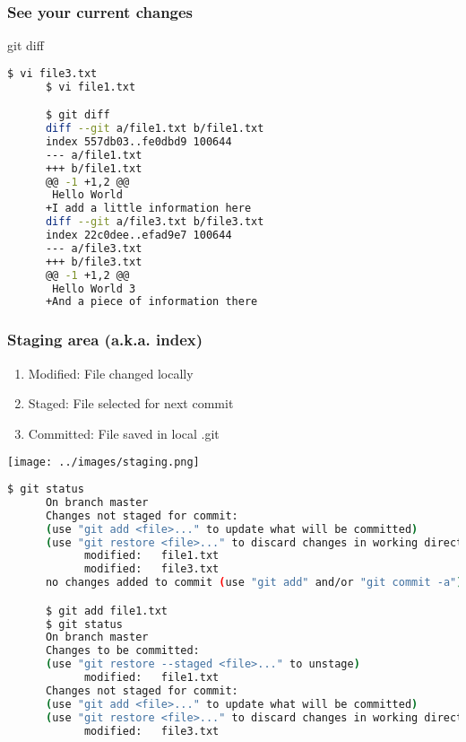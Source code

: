 \begin{frame}[fragile]\frametitle{See your current changes}
   \begin{center}
      \Huge git diff \normalsize
   \end{center}
   \begin{lstlisting}[language=bash, style=bash, autogobble]
      $ vi file3.txt
      $ vi file1.txt

      $ git diff
      diff --git a/file1.txt b/file1.txt
      index 557db03..fe0dbd9 100644
      --- a/file1.txt
      +++ b/file1.txt
      @@ -1 +1,2 @@
       Hello World
      +I add a little information here
      diff --git a/file3.txt b/file3.txt
      index 22c0dee..efad9e7 100644
      --- a/file3.txt
      +++ b/file3.txt
      @@ -1 +1,2 @@
       Hello World 3
      +And a piece of information there
   \end{lstlisting}
\end{frame}

\begin{frame}[fragile]\frametitle{Staging area (a.k.a. index)}
   \begin{minipage}{0.63\linewidth}
      \begin{small}
      \begin{enumerate}
         \setlength\itemsep{1em}
         \item Modified: File changed locally
         \item Staged: File selected for next commit
         \item Committed: File saved in local .git
      \end{enumerate}
      \end{small}
   \end{minipage}
   \begin{minipage}{0.33\linewidth}
      \texttt{[image: ../images/staging.png]}
   \end{minipage}
   \begin{lstlisting}[language=bash, style=bash, autogobble]
      $ git status
      On branch master
      Changes not staged for commit:
      (use "git add <file>..." to update what will be committed)
      (use "git restore <file>..." to discard changes in working directory)
            modified:   file1.txt
            modified:   file3.txt
      no changes added to commit (use "git add" and/or "git commit -a")

      $ git add file1.txt
      $ git status
      On branch master
      Changes to be committed:
      (use "git restore --staged <file>..." to unstage)
            modified:   file1.txt
      Changes not staged for commit:
      (use "git add <file>..." to update what will be committed)
      (use "git restore <file>..." to discard changes in working directory)
            modified:   file3.txt
   \end{lstlisting}
\end{frame}

